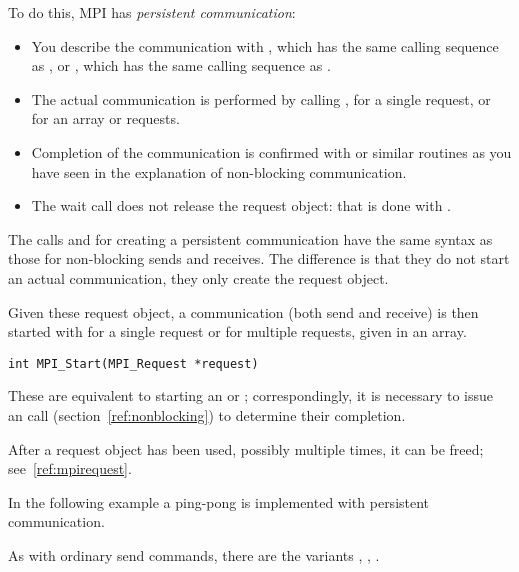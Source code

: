 To do this, MPI has \emph{persistent communication}:
\begin{itemize}
\item You describe the communication with
  , which has the same calling sequence as
  , or , which has the same
  calling sequence as .
\item The actual communication is performed by calling
  , for a single request, or
   for an array or requests.
\item Completion of the communication is confirmed with
   or similar routines as you have seen in the
  explanation of non-blocking communication.
\item The wait call does not release the request object: that is done
  with .
\end{itemize}

The calls  and 
for creating a persistent communication have the same syntax as 
those for non-blocking sends and receives. The difference is that they do not start
an actual communication, they only create the request object.
%
%
%

Given these request object, a communication (both send and receive) is then started
with  for a single request or  for 
multiple requests, given in an array.
\begin{verbatim}
int MPI_Start(MPI_Request *request)
\end{verbatim}
%
%
These are equivalent to starting an  or ; correspondingly, 
it is necessary to issue an  call (section~\ref{ref:nonblocking})
to determine their completion.

After a request object has been used, possibly multiple times, it can be freed; see~\ref{ref:mpirequest}.

In the following example a ping-pong is implemented with persistent communication.

As with ordinary send commands, there are the variants
,
,
.



